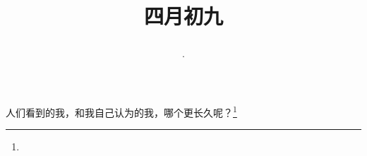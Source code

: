 \title{\date[d=16,m=5,y=2024][year:cn-y,年,month:cn,day:cn,日,·,weekday]·四月初九 }
人们看到的我，和我自己认为的我，哪个更长久呢？\footnote{ }

